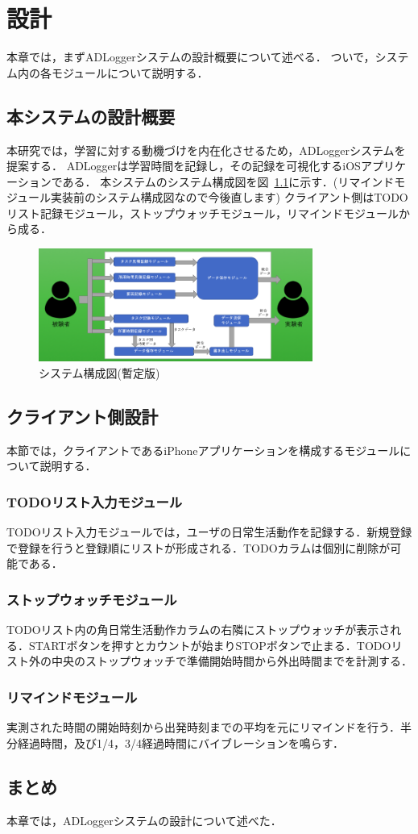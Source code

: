 \chapter{設計}
本章では，まずADLoggerシステムの設計概要について述べる．
ついで，システム内の各モジュールについて説明する．

\section{本システムの設計概要}
本研究では，学習に対する動機づけを内在化させるため，ADLoggerシステムを提案する．
ADLoggerは学習時間を記録し，その記録を可視化するiOSアプリケーションである．
本システムのシステム構成図を図~\ref{fig:system}に示す．(リマインドモジュール実装前のシステム構成図なので今後直します)
クライアント側はTODOリスト記録モジュール，ストップウォッチモジュール，リマインドモジュールから成る．

\begin{figure}[tb]
	\begin{center}
	\includegraphics[width=9cm]{images/5/3.png}
	\end{center}
	\caption{システム構成図(暫定版)}
	\label{fig:system}
\end{figure}

\section{クライアント側設計}
本節では，クライアントであるiPhoneアプリケーションを構成するモジュールについて説明する．

\subsection{TODOリスト入力モジュール}
TODOリスト入力モジュールでは，ユーザの日常生活動作を記録する．新規登録で登録を行うと登録順にリストが形成される．TODOカラムは個別に削除が可能である．
\subsection{ストップウォッチモジュール}
TODOリスト内の角日常生活動作カラムの右隣にストップウォッチが表示される．STARTボタンを押すとカウントが始まりSTOPボタンで止まる．TODOリスト外の中央のストップウォッチで準備開始時間から外出時間までを計測する．
\subsection{リマインドモジュール}
実測された時間の開始時刻から出発時刻までの平均を元にリマインドを行う．半分経過時間，及び1/4，3/4経過時間にバイブレーションを鳴らす．
\section{まとめ}
本章では，ADLoggerシステムの設計について述べた．
